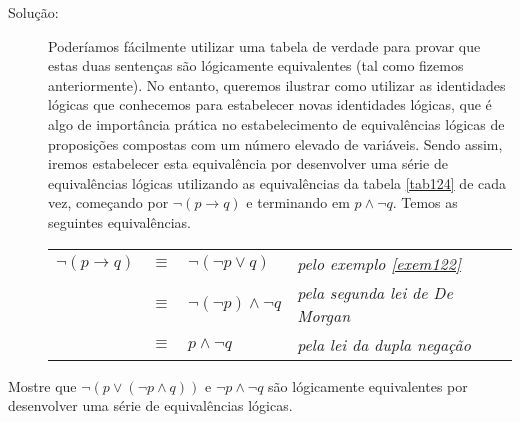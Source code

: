 \begin{description}
\item[Solução:] Poderíamos fácilmente utilizar uma tabela de verdade para provar
que estas duas sentenças são lógicamente equivalentes (tal como fizemos
anteriormente). No entanto, queremos ilustrar como utilizar as identidades
lógicas que conhecemos para estabelecer novas identidades lógicas, que é algo de
importância prática no estabelecimento de equivalências lógicas de proposições
compostas com um número elevado de variáveis. Sendo assim, iremos estabelecer
esta equivalência por desenvolver uma série de equivalências lógicas utilizando
as equivalências da tabela \ref{tab124} de cada vez, começando por $\lnot
(p \to q)$ e terminando em $p \land \lnot q$. Temos as seguintes equivalências.

 \begin{table}[H]
	\centering
	\begin{tabular}{rcll}%
	$\lnot (p \to q)$ & $\equiv$ & $\lnot (\lnot p \lor q)$ & \emph{pelo exemplo
	\ref{exem122}}\\
	 & $\equiv$ & $\lnot (\lnot p) \land \lnot q$ & \emph{pela segunda lei
	 de De Morgan}\\	
	& $\equiv$ & $p \land \lnot q$ & \emph{pela lei da dupla negação}\\	
	\end{tabular}%
\end{table}
\end{description}


\begin{exmp}
\label{exem126}
Mostre que $\lnot (p \lor (\lnot p \land q))$ e $\lnot p \land \lnot q$ são
lógicamente equivalentes por desenvolver uma série de equivalências lógicas.
\end{exmp}


